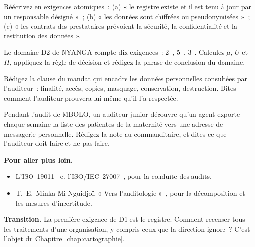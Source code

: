 \begin{boxexo}[title={\ding{45}\quad Exercice~8.2. Rendre atomique \niveaumoyen}]
Réécrivez en exigences atomiques~: (a) « le registre existe et il est tenu à
jour par un responsable désigné »~; (b) « les données sont chiffrées ou
pseudonymisées »~; (c) « les contrats des prestataires prévoient la
sécurité, la confidentialité et la restitution des données ».
\end{boxexo}

\begin{boxexo}[title={\ding{45}\quad Exercice~8.3. Conclure sur D2 \niveaumoyen}]
Le domaine D2 de NYANGA compte dix exigences~: 2~\OUI{}, 5~\NON{}, 3~\NEK{}.
Calculez $\mu$, $U$ et $H$, appliquez la règle de décision et rédigez la
phrase de conclusion du domaine.
\end{boxexo}

\begin{boxexo}[title={\ding{45}\quad Exercice~8.4. L'audit comme traitement \niveauexpert}]
Rédigez la clause du mandat qui encadre les données personnelles consultées
par l'auditeur~: finalité, accès, copies, masquage, conservation,
destruction. Dites comment l'auditeur prouvera lui-même qu'il l'a respectée.
\end{boxexo}

\begin{boxexo}[title={\ding{45}\quad Exercice~8.5. Une découverte \niveauexpert}]
Pendant l'audit de MBOLO, un auditeur junior découvre qu'un agent exporte
chaque semaine la liste des patientes de la maternité vers une adresse de
messagerie personnelle. Rédigez la note au commanditaire, et dites ce que
l'auditeur doit faire et ne pas faire.
\end{boxexo}

\bigskip

\begin{boxinfo}
\textbf{Pour aller plus loin.}
\begin{itemize}
    \item L'ISO~19011~\cite{iso19011_2018} et l'ISO/IEC~27007~\cite{iso27007},
          pour la conduite des audits.
    \item T.~E.~Minka Mi Nguidjoï, « Vers l'auditologie »~\cite{minka2026auditologie},
          pour la décomposition et les mesures d'incertitude.
\end{itemize}
\end{boxinfo}

\begin{boxinfo}
\textbf{Transition.} La première exigence de D1 est le registre. Comment
recenser tous les traitements d'une organisation, y compris ceux que la
direction ignore~? C'est l'objet du Chapitre~\ref{chap:cartographie}.
\end{boxinfo}
